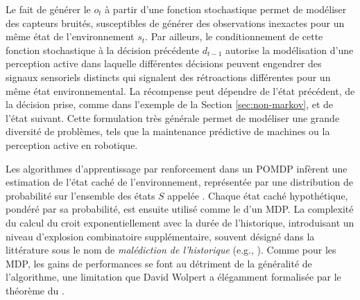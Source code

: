 Le fait de générer le  $o_t$ à partir d'une fonction stochastique permet de modéliser des capteurs bruités, susceptibles de générer des observations inexactes pour un même état de l'environnement $s_t$.
Par ailleurs, le conditionnement de cette fonction stochastique à la décision précédente $d_{t-1}$ autorise la modélisation d'une perception active dans laquelle différentes décisions peuvent engendrer des signaux sensoriels distincts qui signalent des rétroactions différentes pour un même état environnemental.  
La récompense peut dépendre de l'état précédent, de la décision prise, comme dans l'exemple de la Section \ref{sec:non-markov}, et  de l'état suivant.
Cette formulation très générale permet de modéliser une grande diversité de problèmes, tels que la maintenance prédictive de machines ou la perception active en robotique. 



Les algorithmes d'apprentissage par renforcement dans un POMDP  infèrent une estimation de l'état caché de l'environnement, représentée par une distribution de probabilité sur l'ensemble des états $S$ appelée . 
Chaque état caché hypothétique, pondéré par sa probabilité, est ensuite utilisé comme le  d'un MDP. 
La complexité du calcul du  croit exponentiellement avec la durée de l'historique, introduisant un niveau d'explosion combinatoire supplémentaire, souvent désigné dans la littérature sous le nom de \emph{malédiction de l'historique}  (e.g., \cite{zhang_curses_2025}). %
Comme pour les MDP, les gains de performances se font au détriment de la généralité de l'algorithme, une limitation que David Wolpert a élégamment formalisée par le théorème du  \og {} \fg \cite{wolpert_no_1997}.

